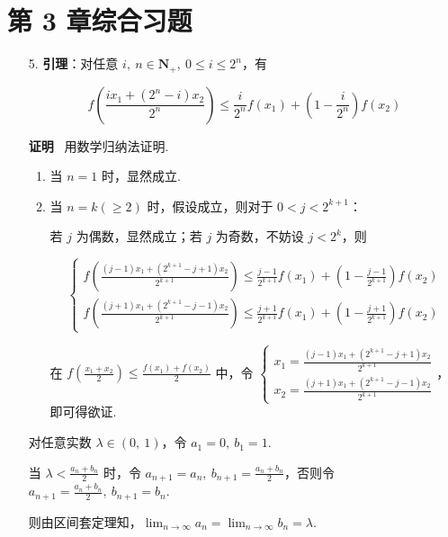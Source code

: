 \documentclass[oneside]{ctexbook} %
\begin{document}
\section*{第 3 章综合习题}

\begin{enumerate}
    \item[5.]
    \textbf{引理}：对任意 $i,\ n \in \mathbf{N_+},\ 0 \leqslant i \leqslant 2^n$，有
    
    $$
    f\left( \frac{ix_1+(2^n-i)x_2}{2^n} \right) \leqslant \frac i {2^n} f(x_1) + \left( 1 - \frac i {2^n} \right) f(x_2)
    $$
    
    \textbf{证明} \ 用数学归纳法证明.
    
    \begin{enumerate}
        \item
        当 $n = 1$ 时，显然成立.
        \item
        当 $n = k (\geqslant 2)$ 时，假设成立，则对于 $0 < j < 2^{k+1}$：
        
        若 $j$ 为偶数，显然成立；若 $j$ 为奇数，不妨设 $j < 2^k$，则
        
        $$
        \begin{cases}
            f\left( \frac{(j-1)x_1+(2^{k+1}-j+1)x_2}{2^{k+1}} \right) \leqslant \frac {j-1} {2^{k+1}} f(x_1) + \left( 1 - \frac {j-1} {2^{k+1}} \right) f(x_2) \\
            f\left( \frac{(j+1)x_1+(2^{k+1}-j-1)x_2}{2^{k+1}} \right) \leqslant \frac {j+1} {2^{k+1}} f(x_1) + \left( 1 - \frac {j+1} {2^{k+1}} \right) f(x_2)
        \end{cases}
        $$
        
        在 $f\left( \frac {x_1+x_2} 2 \right) \leqslant \frac {f(x_1)+f(x_2)} 2$ 中，令 $\begin{cases} x_1 = \frac{(j-1)x_1+(2^{k+1}-j+1)x_2}{2^{k+1}} \\ x_2 = \frac{(j+1)x_1+(2^{k+1}-j-1)x_2}{2^{k+1}} \end{cases}$，即可得欲证.
    \end{enumerate}
    
    对任意实数 $\lambda \in (0,\ 1)$，令 $a_1 = 0,\ b_1 = 1$.
    
    当 $\lambda < \frac {a_n+b_n} 2$ 时，令 $a_{n+1} = a_n,\ b_{n+1} = \frac {a_n+b_n} 2$，否则令 $a_{n+1} = \frac {a_n+b_n} 2,\ b_{n+1} = b_n$.
    
    则由区间套定理知，$\displaystyle\lim_{n \to \infty} a_n = \lim_{n \to \infty} b_n = \lambda$.
    

\end{enumerate}
\end{document}
